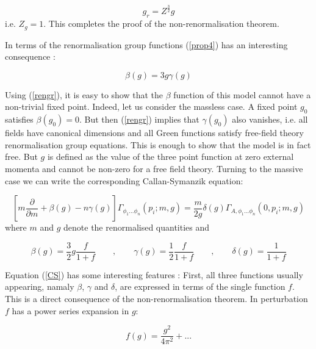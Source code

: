 \documentclass[a4paper,11pt]{article}
\begin{document}
\begin{equation}
\label{prop4}
g_r = Z^{\frac{3}{2}} g
\end{equation}
\noindent
i.e. $Z_g = 1$. This completes the proof of the non-renormalisation theorem.

In terms of the renormalisation group functions (\ref{prop4}) has an interesting 
consequence \cite{FIZ}:

\begin{equation}
\label{rengr}
\beta (g) = 3 g \gamma (g)
\end{equation}

Using (\ref{rengr}), it is easy to show that the $\beta$ function of this model 
cannot have a non-trivial fixed point. Indeed, let us consider the massless case. 
A fixed point $g_0$ satisfies $\beta(g_0) = 0$. 
But then (\ref{rengr}) implies that $\gamma(g_0)$ also vanishes, i.e. all fields have 
canonical dimensions and all Green functions satisfy free-field theory 
renormalisation group equations. This is enough to show that the model is in fact 
free. But $g$ is defined as the value of the three point function at zero external 
momenta and cannot be non-zero for a free field theory. Turning to the massive case 
we can write the corresponding Callan-Symanzik equation:

\begin{equation}
\label{CS}
[m  \frac{\partial}{\partial m} + \beta (g) - n \gamma (g) ] 
{\Gamma}_{\phi_1 ... \phi_n}(p_i ;m,g) = \frac{m}{2g} \delta (g) 
{\Gamma}_{A, \phi_1 ... \phi_n}(0, p_i ;m,g)
\end{equation}
\noindent
where $m$ and $g$ denote the renormalised quantities and

\begin{equation}
\label{CS1}
\beta (g) = {\scriptstyle {\frac{3}{2}}} g \frac{f}{1+f} \qquad , 
\qquad  \gamma (g) = {\scriptstyle {\frac{1}{2}}} \frac{f}{1+f} \qquad , 
\qquad \delta (g) = \frac{1}{1+f}
\end{equation}

Equation (\ref{CS}) has some interesting features \cite{FIZ} : First, all three 
functions usually appearing, namaly $\beta$, $\gamma$ and $\delta$, are expressed 
in terms of the single function $f$. This is a direct consequence of the 
non-renormalisation theorem. In perturbation $f$ has a power series expansion in $g$:

\begin{equation}
\label{CS2}
f(g) = \frac{g^2}{4 \pi^2} +...
\end{equation}
\end{document}

